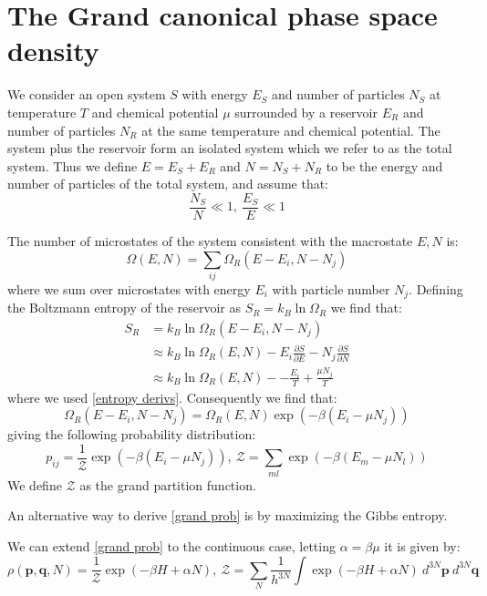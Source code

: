 \documentclass[a4paper,11pt,oneside]{book}
\begin{document}
\section{The Grand canonical phase space density}
We consider an open system $S$ with energy $E_S$ and number of particles $N_S$ at temperature $T$ and chemical potential $\mu$ surrounded by a reservoir $E_R$ and number of particles $N_R$ at the same temperature and chemical potential. The system plus the reservoir form an isolated system which we refer to as the total system. Thus we define $E=E_S+E_R$ and $N=N_S+N_R$ to be the energy and number of particles of the total system, and assume that:
\begin{equation}
    \frac{N_S}{N}\ll 1, \ \frac{E_S}{E}\ll 1
\end{equation}

The number of microstates of the system consistent with the macrostate $E,N$ is:
\begin{equation}
    \Omega(E,N) = \sum_{ij} \Omega_R(E-E_i,N-N_j)
\end{equation}
where we sum over microstates with energy $E_i$ with particle number $N_j$. Defining the Boltzmann entropy of the reservoir as $S_R = k_B \ln \Omega_R$ we find that:
\begin{align}
    S_R &= k_B \ln \Omega_R(E-E_i,N-N_j) \\
    &\approx k_B \ln \Omega_R(E,N) - E_i \frac{\partial S}{\partial E} - N_j\frac{\partial S}{\partial N}\\
    &\approx k_B \ln \Omega_R(E,N) - -\frac{E_i}{T}+\frac{\mu N_j}{T}
\end{align}
where we used \eqref{entropy derivs}. Consequently we find that:
\begin{equation}
    \Omega_R(E-E_i,N-N_j) = \Omega_R(E,N) \exp(-\beta(E_i-\mu N_j))
\end{equation}
giving the following probability distribution:
\begin{equation}\label{grand prob}
    \boxed{p_{ij} = \frac{1}{\mathcal{Z}} \exp(-\beta(E_i-\mu N_j)), \ \mathcal{Z} = \sum_{ml}\exp(-\beta(E_m-\mu N_l))}
\end{equation}
We define $\mathcal{Z}$ as the grand partition function. 

An alternative way to derive \eqref{grand prob} is by maximizing the Gibbs entropy.


We can extend \eqref{grand prob} to the continuous case, letting $\alpha = \beta \mu$ it is given by:
\begin{equation}
    \boxed{\rho(\textbf{p},\textbf{q},N) = \frac{1}{\mathcal{Z}} \exp(-\beta H+\alpha N), \ \mathcal{Z} = \sum_N \frac{1}{h^{3N}} \int \exp(-\beta H + \alpha N)\ d^{3N} \textbf{p} \ d^{3N} \textbf{q}}
\end{equation}
\end{document}
